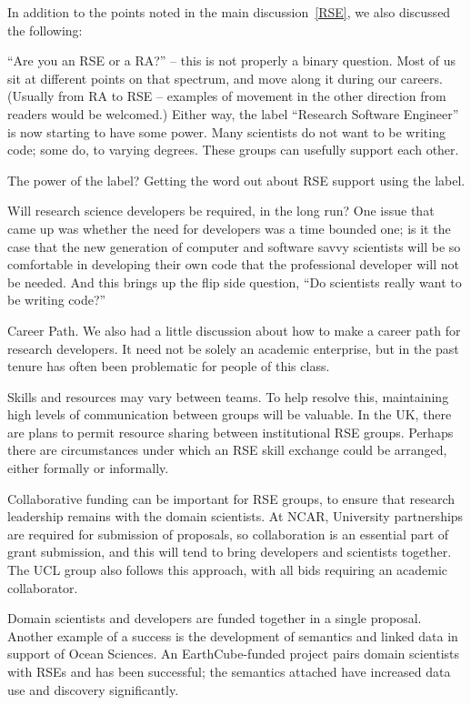 In addition to the points noted in the main discussion~\ref{RSE}, we also
discussed the following:

``Are you an RSE or a RA?'' -- this is not properly a binary question. Most of
us sit at different points on that spectrum, and move along it during our
careers. (Usually from RA to RSE -- examples of movement in the other direction
from readers would be welcomed.)
Either way, the label ``Research Software Engineer'' is now starting to
have some power. Many scientists do not want to be writing code; some do, to
varying degrees. These groups can usefully support each other.

The power of the label? Getting the word out about RSE support using the label.

Will research science developers be required, in the long run?
One issue that came up was whether the need for developers was a time bounded one; is it the case that the new generation of computer and software savvy scientists will be so comfortable in developing their own code that the professional developer will not be needed. And this brings up the flip side question, “Do scientists really want to be writing code?”

Career Path.
We also had a little discussion about how to make a career path for research developers. It need not be solely an academic enterprise, but in the past tenure has often been problematic for people of this class.

Skills and resources may vary between teams. To help resolve this, maintaining
high levels of communication between groups will be valuable. In the UK, there
are plans to permit resource sharing between institutional RSE groups. Perhaps 
there are circumstances under which an RSE skill exchange could be arranged, either
formally or informally. 

Collaborative funding can be important for RSE groups, to ensure that research
leadership remains with the domain scientists. At NCAR, University partnerships
are required for submission of proposals, so collaboration is an essential part
of grant submission, and this will tend to bring developers and
scientists together. The UCL group also follows this approach, with all bids
requiring an academic collaborator.

Domain scientists and developers are funded together in a single proposal.
Another example of a success is the development of semantics and linked data in
support of Ocean Sciences. An EarthCube-funded project pairs domain scientists
with RSEs and has been successful; the semantics attached have increased data
use and discovery significantly.

